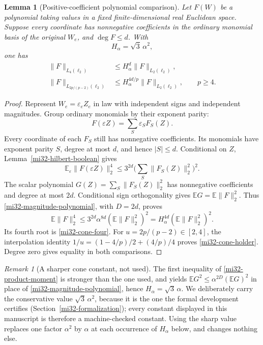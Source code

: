 \documentclass[11pt]{article}
\newtheorem{lemma}[theorem]{Lemma}
\theoremstyle{definition}
\theoremstyle{remark}
\newtheorem{remark}[theorem]{Remark}
\newcommand{\E}{\mathbb E}
\newcommand{\norm}[1]{\lVert#1\rVert}
\begin{document}
\begin{lemma}[Positive-coefficient polynomial comparison]
\label{mi32-cone-lemma}
Let $F(W)$ be a polynomial taking values in a fixed finite-dimensional
real Euclidean space. Suppose every coordinate has nonnegative
coefficients in the ordinary monomial basis of the original $W_e$,
and $\deg F\le d$. With
\begin{equation}\label{mi32-H-constant}
 H_\alpha=\sqrt3\,\alpha^2,
\end{equation}
one has
\begin{align}
 \norm{F}_{L_4(\ell_2)}&\le H_\alpha^d\norm{F}_{L_2(\ell_2)},
                  \label{mi32-cone-four}\\
 \norm{F}_{L_{2p/(p-2)}(\ell_2)}
   &\le H_\alpha^{4d/p}\norm{F}_{L_2(\ell_2)},\qquad p\ge4.
                  \label{mi32-cone-holder}
\end{align}
\end{lemma}
\begin{proof}
Represent $W_e=\varepsilon_eZ_e$ in law with independent signs and
independent magnitudes. Group ordinary monomials by their exponent
parity:
\[
 F(\varepsilon Z)=\sum_S\varepsilon_SF_S(Z).
\]
Every coordinate of each $F_S$ still has nonnegative coefficients.
Its monomials have exponent parity $S$, degree at most $d$, and hence
$|S|\le d$. Conditional on $Z$, Lemma~\ref{mi32-hilbert-boolean}
gives
\begin{equation}\label{mi32-conditional-fourth}
 \E_\varepsilon\norm{F(\varepsilon Z)}_2^4
 \le3^{2d}\Big(\sum_S\norm{F_S(Z)}_2^2\Big)^2.
\end{equation}
The scalar polynomial $G(Z)=\sum_S\norm{F_S(Z)}_2^2$ has
nonnegative coefficients and degree at most $2d$. Conditional sign
orthogonality gives $\E G=\E\norm{F}_2^2$. Thus
\eqref{mi32-magnitude-polynomial}, with $D=2d$, proves
\[
 \E\norm{F}_2^4\le3^{2d}\alpha^{8d}(\E\norm{F}_2^2)^2
                =H_\alpha^{4d}(\E\norm{F}_2^2)^2.
\]
Its fourth root is \eqref{mi32-cone-four}. For
$u=2p/(p-2)\in[2,4]$, the interpolation identity
$1/u=(1-4/p)/2+(4/p)/4$ proves \eqref{mi32-cone-holder}.
Degree zero gives equality in both comparisons.
\end{proof}

\begin{remark}[A sharper cone constant, not used]
\label{mi32-sharp-cone-remark}
The first inequality of \eqref{mi32-product-moment} is stronger than
the one used, and yields $\E G^2\le\alpha^{2D}(\E G)^2$ in place of
\eqref{mi32-magnitude-polynomial}, hence $H_\alpha=\sqrt3\,\alpha$.
We deliberately carry the conservative value $\sqrt3\,\alpha^2$,
because it is the one the formal development certifies
(Section~\ref{mi32-formalization}); every constant displayed in this
manuscript is therefore a machine-checked constant. Using the sharp
value replaces one factor $\alpha^2$ by $\alpha$ at each occurrence of
$H_\alpha$ below, and changes nothing else.
\end{remark}
\end{document}
